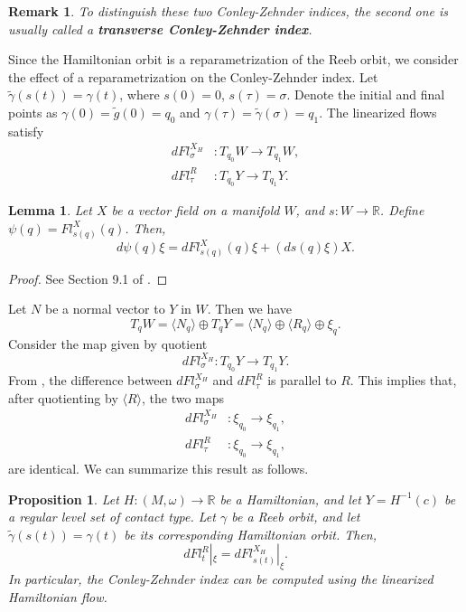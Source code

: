 \documentclass{amsart}
\newcommand{\R}{\mathbb{R}}
\renewcommand{\o}{\omega}
\newcommand{\g}{\gamma}
\newtheorem{lmm}[thm]{Lemma}
\newtheorem{prop}[thm]{Proposition}
\newtheorem{remark}[thm]{Remark}
\begin{document}
\begin{remark}\rm
	To distinguish these two Conley-Zehnder indices, the second one is usually called a \textbf{transverse Conley-Zehnder index}.
\end{remark}

Since the Hamiltonian orbit is a reparametrization of the Reeb orbit, we consider the effect of a reparametrization on the Conley-Zehnder index.
Let $\tilde{\g}(s(t))=\g(t)$, where $s(0)=0$, $s(\tau)=\sigma$.
Denote the initial and final points as $\g(0)=\tilde{g}(0)=q_0$ and $\g(\tau)=\tilde{\g}(\sigma)=q_1$.
The linearized flows satisfy
$$
\begin{aligned}
	dFl^{X_H}_\sigma&:T_{q_0} W \to T_{q_1} W,\\
	dFl^R_\tau&:T_{q_0}Y\to T_{q_1}Y.
\end{aligned}
$$
\begin{lmm}\label{Lemma - Reparametrization and linearized flow}
	Let $X$ be a vector field on a manifold $W$, and $s:W\to \R$.
	Define $\psi(q) = Fl^X_{s(q)}(q)$.
	Then,
	$$
	d\psi(q) \xi = dFl^X_{s(q)}(q)\xi + (ds(q)\xi)X.
	$$
\end{lmm}
\begin{proof}
	See Section 9.1 of \cite{Frauenfelder_van_Koert_18}.
\end{proof}
Let $N$ be a normal vector to $Y$ in $W$.
Then we have
$$T_q W = \langle N_q \rangle \oplus T_q Y = \langle N_q \rangle \oplus \langle R_q \rangle \oplus \xi_q.$$
Consider the map given by quotient
$$
dFl^{X_H}_\sigma:T_{q_0} Y \to T_{q_1} Y.
$$
From , the difference between $dFl^{X_H}_\sigma$ and $dFl^R_\tau$ is parallel to $R$.
This implies that, after quotienting by $\langle R\rangle$, the two maps
$$
\begin{aligned}
	dFl^{X_H}_\sigma&:\xi_{q_0}\to\xi_{q_1},\\
	dFl^R_\tau&:\xi_{q_0}\to\xi_{q_1},
\end{aligned}
$$
are identical.
We can summarize this result as follows.
\begin{prop}\label{Proposition - CZ index can be computed by Hamiltonian}
	Let $H:(M,\o)\to \R$ be a Hamiltonian, and let $Y=H^{-1}(c)$ be a regular level set of contact type.
	Let $\g$ be a Reeb orbit, and let $\tilde{\g}(s(t))=\g(t)$ be its corresponding Hamiltonian orbit. Then,
	$$
	dFl^R_t|_\xi = dFl^{X_H}_{s(t)}|_\xi.
	$$
	In particular, the Conley-Zehnder index can be computed using the linearized Hamiltonian flow.
\end{prop}
\end{document}
